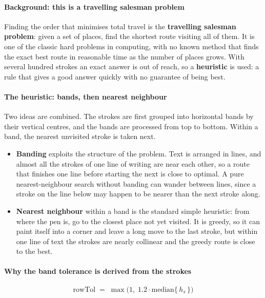 \paragraph{Background: this is a travelling salesman problem}
Finding the order that minimises total travel is the \textbf{travelling salesman problem}: given a set of places, find the shortest route visiting all of them. It is one of the classic hard problems in computing, with no known method that finds the exact best route in reasonable time as the number of places grows. With several hundred strokes an exact answer is out of reach, so a \textbf{heuristic} is used: a rule that gives a good answer quickly with no guarantee of being best.


\paragraph{The heuristic: bands, then nearest neighbour}
Two ideas are combined. The strokes are first grouped into horizontal bands by their vertical centres, and the bands are processed from top to bottom. Within a band, the nearest unvisited stroke is taken next.


\begin{itemize}\setlength\itemsep{0pt}
  \item \textbf{Banding} exploits the structure of the problem. Text is arranged in lines, and almost all the strokes of one line of writing are near each other, so a route that finishes one line before starting the next is close to optimal. A pure nearest-neighbour search without banding can wander between lines, since a stroke on the line below may happen to be nearer than the next stroke along.
  \item \textbf{Nearest neighbour} within a band is the standard simple heuristic: from where the pen is, go to the closest place not yet visited. It is greedy, so it can paint itself into a corner and leave a long move to the last stroke, but within one line of text the strokes are nearly collinear and the greedy route is close to the best.
\end{itemize}

\paragraph{Why the band tolerance is derived from the strokes}

\begin{equation}
\mathrm{rowTol} \;=\; \max\big(1,\; 1.2 \cdot \mathrm{median}\{\,h_s\,\}\big)
\end{equation}

